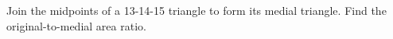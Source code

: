 Join the midpoints of a 13-14-15 triangle to form its medial triangle. Find the original-to-medial area ratio.
